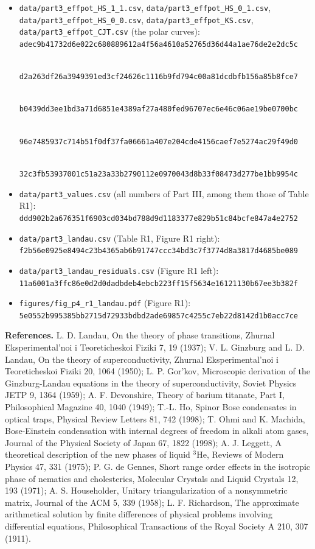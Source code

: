 \documentclass[
  10pt,
]{article}
\providecommand{\tightlist}{%
  \setlength{\itemsep}{0pt}\setlength{\parskip}{0pt}}
\begin{document}
\begin{itemize}
\tightlist
\item
  \texttt{data/part3\_effpot\_HS\_1\_1.csv},
  \texttt{data/part3\_effpot\_HS\_0\_1.csv},
  \texttt{data/part3\_effpot\_HS\_0\_0.csv},
  \texttt{data/part3\_effpot\_KS.csv},
  \texttt{data/part3\_effpot\_CJT.csv} (the polar curves):\\
  \texttt{adec9b41732d6e022c680889612a4f56a4610a52765d36d44a1ae76de2e2dc5c}\strut \\
  \texttt{d2a263df26a3949391ed3cf24626c1116b9fd794c00a81dcdbfb156a85b8fce7}\strut \\
  \texttt{b0439dd3ee1bd3a71d6851e4389af27a480fed96707ec6e46c06ae19be0700bc}\strut \\
  \texttt{96e7485937c714b51f0df37fa06661a407e204cde4156caef7e5274ac29f49d0}\strut \\
  \texttt{32c3fb53937001c51a23a33b2790112e0970043d8b33f08473d277be1bb9954c}
\item
  \texttt{data/part3\_values.csv} (all numbers of Part III, among them
  those of Table R1):\\
  \texttt{ddd902b2a676351f6903cd034bd788d9d1183377e829b51c84bcfe847a4e2752}
\item
  \texttt{data/part3\_landau.csv} (Table R1, Figure R1 right):\\
  \texttt{f2b56e0925e8494c23b4365ab6b91747ccc34bd3c7f3774d8a3817d4685be089}
\item
  \texttt{data/part3\_landau\_residuals.csv} (Figure R1 left):\\
  \texttt{11a6001a3ffc86e0d2d0dadbdeb4ebcb223ff15f5634e16121130b67ee3b382f}
\item
  \texttt{figures/fig\_p4\_r1\_landau.pdf} (Figure R1):\\
  \texttt{5e0552b995385bb2715d72933bdbd2ade69857c4255c7eb22d8142d1b0acc7ce}
\end{itemize}

\textbf{References.} L. D. Landau, On the theory of phase transitions,
Zhurnal Eksperimental'noi i Teoreticheskoi Fiziki 7, 19 (1937); V. L.
Ginzburg and L. D. Landau, On the theory of superconductivity, Zhurnal
Eksperimental'noi i Teoreticheskoi Fiziki 20, 1064 (1950); L. P.
Gor'kov, Microscopic derivation of the Ginzburg-Landau equations in the
theory of superconductivity, Soviet Physics JETP 9, 1364 (1959); A. F.
Devonshire, Theory of barium titanate, Part I, Philosophical Magazine
40, 1040 (1949); T.-L. Ho, Spinor Bose condensates in optical traps,
Physical Review Letters 81, 742 (1998); T. Ohmi and K. Machida,
Bose-Einstein condensation with internal degrees of freedom in alkali
atom gases, Journal of the Physical Society of Japan 67, 1822 (1998); A.
J. Leggett, A theoretical description of the new phases of liquid
\(^3\)He, Reviews of Modern Physics 47, 331 (1975); P. G. de Gennes,
Short range order effects in the isotropic phase of nematics and
cholesterics, Molecular Crystals and Liquid Crystals 12, 193 (1971); A.
S. Householder, Unitary triangularization of a nonsymmetric matrix,
Journal of the ACM 5, 339 (1958); L. F. Richardson, The approximate
arithmetical solution by finite differences of physical problems
involving differential equations, Philosophical Transactions of the
Royal Society A 210, 307 (1911).
\end{document}
